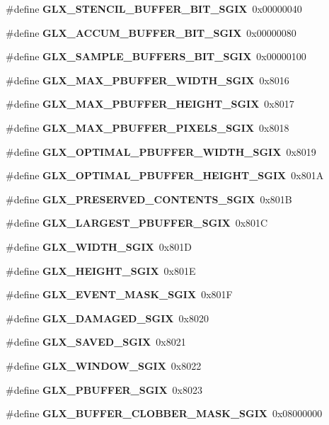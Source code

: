 \begin{DoxyCompactItemize}
\item 
\#define {\bf G\+L\+X\+\_\+\+S\+T\+E\+N\+C\+I\+L\+\_\+\+B\+U\+F\+F\+E\+R\+\_\+\+B\+I\+T\+\_\+\+S\+G\+IX}~0x00000040
\item 
\#define {\bf G\+L\+X\+\_\+\+A\+C\+C\+U\+M\+\_\+\+B\+U\+F\+F\+E\+R\+\_\+\+B\+I\+T\+\_\+\+S\+G\+IX}~0x00000080
\item 
\#define {\bf G\+L\+X\+\_\+\+S\+A\+M\+P\+L\+E\+\_\+\+B\+U\+F\+F\+E\+R\+S\+\_\+\+B\+I\+T\+\_\+\+S\+G\+IX}~0x00000100
\item 
\#define {\bf G\+L\+X\+\_\+\+M\+A\+X\+\_\+\+P\+B\+U\+F\+F\+E\+R\+\_\+\+W\+I\+D\+T\+H\+\_\+\+S\+G\+IX}~0x8016
\item 
\#define {\bf G\+L\+X\+\_\+\+M\+A\+X\+\_\+\+P\+B\+U\+F\+F\+E\+R\+\_\+\+H\+E\+I\+G\+H\+T\+\_\+\+S\+G\+IX}~0x8017
\item 
\#define {\bf G\+L\+X\+\_\+\+M\+A\+X\+\_\+\+P\+B\+U\+F\+F\+E\+R\+\_\+\+P\+I\+X\+E\+L\+S\+\_\+\+S\+G\+IX}~0x8018
\item 
\#define {\bf G\+L\+X\+\_\+\+O\+P\+T\+I\+M\+A\+L\+\_\+\+P\+B\+U\+F\+F\+E\+R\+\_\+\+W\+I\+D\+T\+H\+\_\+\+S\+G\+IX}~0x8019
\item 
\#define {\bf G\+L\+X\+\_\+\+O\+P\+T\+I\+M\+A\+L\+\_\+\+P\+B\+U\+F\+F\+E\+R\+\_\+\+H\+E\+I\+G\+H\+T\+\_\+\+S\+G\+IX}~0x801A
\item 
\#define {\bf G\+L\+X\+\_\+\+P\+R\+E\+S\+E\+R\+V\+E\+D\+\_\+\+C\+O\+N\+T\+E\+N\+T\+S\+\_\+\+S\+G\+IX}~0x801B
\item 
\#define {\bf G\+L\+X\+\_\+\+L\+A\+R\+G\+E\+S\+T\+\_\+\+P\+B\+U\+F\+F\+E\+R\+\_\+\+S\+G\+IX}~0x801C
\item 
\#define {\bf G\+L\+X\+\_\+\+W\+I\+D\+T\+H\+\_\+\+S\+G\+IX}~0x801D
\item 
\#define {\bf G\+L\+X\+\_\+\+H\+E\+I\+G\+H\+T\+\_\+\+S\+G\+IX}~0x801E
\item 
\#define {\bf G\+L\+X\+\_\+\+E\+V\+E\+N\+T\+\_\+\+M\+A\+S\+K\+\_\+\+S\+G\+IX}~0x801F
\item 
\#define {\bf G\+L\+X\+\_\+\+D\+A\+M\+A\+G\+E\+D\+\_\+\+S\+G\+IX}~0x8020
\item 
\#define {\bf G\+L\+X\+\_\+\+S\+A\+V\+E\+D\+\_\+\+S\+G\+IX}~0x8021
\item 
\#define {\bf G\+L\+X\+\_\+\+W\+I\+N\+D\+O\+W\+\_\+\+S\+G\+IX}~0x8022
\item 
\#define {\bf G\+L\+X\+\_\+\+P\+B\+U\+F\+F\+E\+R\+\_\+\+S\+G\+IX}~0x8023
\item 
\#define {\bf G\+L\+X\+\_\+\+B\+U\+F\+F\+E\+R\+\_\+\+C\+L\+O\+B\+B\+E\+R\+\_\+\+M\+A\+S\+K\+\_\+\+S\+G\+IX}~0x08000000
\item 

\end{DoxyCompactItemize}
